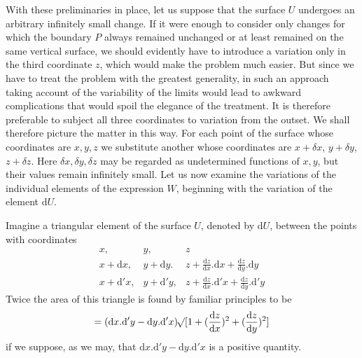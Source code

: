 With these preliminaries in place, let us suppose that the surface $U$ undergoes an arbitrary infinitely small change. If it were enough to consider only changes for which the boundary $P$ always remained unchanged or at least remained on the same vertical surface, we should evidently have to introduce a variation only in the third coordinate $z$, which would make the problem much easier. But since we have to treat the problem with the greatest generality, in such an approach taking account of the variability of the limits would lead to awkward complications that would spoil the elegance of the treatment. It is therefore preferable to subject all three coordinates to variation from the outset. We shall therefore picture the matter in this way. For each point of the surface whose coordinates are $x,y,z$ we substitute another whose coordinates are $x+\delta x$, $y+\delta y$, $z+\delta z$. Here $\delta x,\delta y,\delta z$ may be regarded as undetermined functions of $x,y$, but their values remain infinitely small. Let us now examine the variations of the individual elements of the expression $W$, beginning with the variation of the element $\mathrm{d}U$.

Imagine a triangular element of the surface $U$, denoted by $\mathrm{d}U$, between the points with coordinates
\[
\begin{array}{lll}
x,&y,&z\\
x+\mathrm{d}x,&y+\mathrm{d}y.&z+\frac{\mathrm{d}z}{\mathrm{d}x}.\mathrm{d}x+\frac{\mathrm{d}z}{\mathrm{d}y}.\mathrm{d}y\\
x+\mathrm{d}'x,&y+\mathrm{d}'y,&z+\frac{\mathrm{d}z}{\mathrm{d}x}.\mathrm{d}'x+\frac{\mathrm{d}z}{\mathrm{d}y}.\mathrm{d}'y
\end{array}
\]
Twice the area of this triangle is found by familiar principles to be
\[
=(\mathrm{d}x.\mathrm{d}'y-\mathrm{d}y.\mathrm{d}'x)\mathord{{}^{}\!\surd}[1+(\frac{\mathrm{d}z}{\mathrm{d}x})^2+(\frac{\mathrm{d}z}{\mathrm{d}y})^2]
\]
if we suppose, as we may, that $\mathrm{d}x.\mathrm{d}'y-\mathrm{d}y.\mathrm{d}'x$ is a positive quantity.

